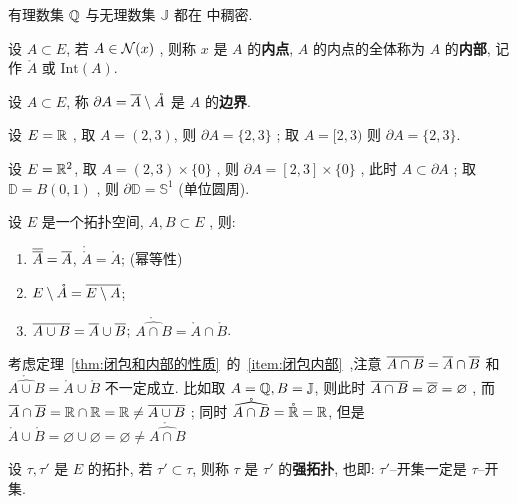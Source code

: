 \begin{Example}
	有理数集 $ \Q $ 与无理数集 $ \mathbb{J} $ 都在 \R 中稠密.
\end{Example}
\begin{Definition}[内部]\label{def:内部}
	设 $ A\subset E $, 若 $ A\in\CN(x) $ , 则称 $ x $ 是 $ A $ 的\textbf{内点},  $ A $ 的内点的全体称为 $ A $ 的\textbf{内部}, 记作 $ \mathring{A} $ 或 $ \mathrm{Int}(A) $.
\end{Definition}
\begin{Definition}[边界]\label{def:边界}
	设 $ A\subset E $, 称 $ \partial A = \baro{A}\sm\mathring{A} $ 是 $ A $ 的\textbf{边界}.
\end{Definition}
\begin{Example}
	设 $ E=\R $ , 取 $ A = (2, 3) $, 则 $ \partial A = \{ 2, 3 \} $ ; 取 $ A = [2, 3) $ 则 $ \partial A = \{ 2, 3 \} $.

	设 $ E = \R^{2} $, 取 $ A = (2, 3)\times \{0\} $ , 则 $ \partial A = [2, 3]\times \{0\} $ , 此时 $ A\subset \partial A $  ; 取 $ \mathbb{D}=B(0, 1) $ , 则 $ \partial \mathbb{D}=\mathbb{S}^{1} $ (单位圆周).
\end{Example}
\begin{Theorem}\label{thm:闭包和内部的性质}
	设 $ E $ 是一个拓扑空间, $ A, B\subset E $ , 则:
	\begin{enumerate}[(1)]
		\item $ \baro{\baro{A}}=\baro{A} $, $ \mathring{\mathring{A}}=\mathring{A} $; (幂等性)
		\item $ E\sm\mathring{A}=\overline{E\sm A} $;
		\item \label{item:闭包内部}$ \overline {A\cup B}=\baro{A}\cup \baro{B} $; $ \mathring{\widehat{A\cap B}}=\mathring{A}\cap\mathring{B} $.
	\end{enumerate}
\end{Theorem}
\begin{Remark}
	考虑定理~\ref{thm:闭包和内部的性质}~的~\ref{item:闭包内部}~,注意 $ \overline {A\cap B}=\baro{A}\cap \baro{B} $ 和 $ \mathring{\widehat{A\cup B}}=\mathring{A}\cup\mathring{B} $ 不一定成立. 比如取 $ A=\Q, B=\mathbb{J} $, 则此时 $ \overline{A\cap B}=\baro{\varnothing}=\varnothing $  , 而 $ \baro{A}\cap \baro{B}=\R\cap\R=\R\neq\overline {A\cup B} $ ; 同时 $ \mathring{\widehat{A\cap B}}=\mathring{\R}=\R $, 但是 $ \mathring{A}\cup\mathring{B}=\varnothing\cup\varnothing=\varnothing\neq \mathring{\widehat{A\cap B}} $
\end{Remark}
\begin{Definition}[拓扑比较]\label{def:拓扑比较}
	设 $ \tau, \tau' $ 是 $ E $ 的拓扑, 若 $ \tau'\subset\tau $, 则称 $ \tau $ 是 $ \tau' $ 的\textbf{强拓扑}, 也即: $ \tau' $--开集一定是 $ \tau $--开集.
\end{Definition}
